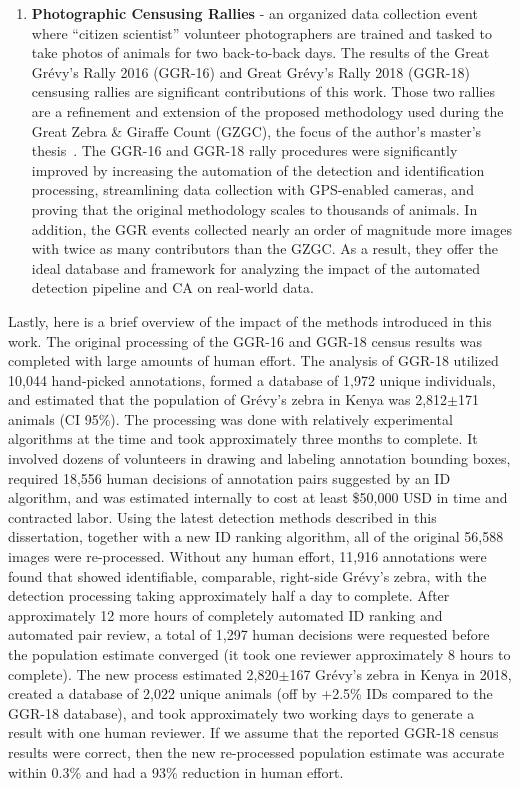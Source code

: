 \begin{enumerate}
    \item \textbf{Photographic Censusing Rallies} - an organized data collection event where ``citizen scientist'' volunteer photographers are trained and tasked to take photos of animals for two back-to-back days.  The results of the Great Gr\'evy's Rally 2016 (GGR-16) and Great Gr\'evy's Rally 2018 (GGR-18) censusing rallies are significant contributions of this work.  Those two rallies are a refinement and extension of the proposed methodology used during the Great Zebra \& Giraffe Count (GZGC), the focus of the author's master's thesis~\cite{parham_photographic_2015}.  The GGR-16 and GGR-18 rally procedures were significantly improved by increasing the automation of the detection and identification processing, streamlining data collection with GPS-enabled cameras, and proving that the original methodology scales to thousands of animals. In addition, the GGR events collected nearly an order of magnitude more images with twice as many contributors than the GZGC.  As a result, they offer the ideal database and framework for analyzing the impact of the automated detection pipeline and CA on real-world data.
\end{enumerate}

Lastly, here is a brief overview of the impact of the methods introduced in this work.  The original processing of the GGR-16 and GGR-18 census results was completed with large amounts of human effort.  The analysis of GGR-18 utilized 10,044 hand-picked annotations, formed a database of 1,972 unique individuals, and estimated that the population of Gr\'evy's zebra in Kenya was 2,812$\pm$171 animals (CI 95\%).  The processing was done with relatively experimental algorithms at the time and took approximately three months to complete.  It involved dozens of volunteers in drawing and labeling annotation bounding boxes, required 18,556 human decisions of annotation pairs suggested by an ID algorithm, and was estimated internally to cost at least \$50,000 USD in time and contracted labor.  Using the latest detection methods described in this dissertation, together with a new ID ranking algorithm, all of the original 56,588 images were re-processed.  Without any human effort, 11,916 annotations were found that showed identifiable, comparable, right-side Gr\'evy's zebra, with the detection processing taking approximately half a day to complete.  After approximately 12 more hours of completely automated ID ranking and automated pair review, a total of 1,297 human decisions were requested before the population estimate converged (it took one reviewer approximately 8 hours to complete). The new process estimated 2,820$\pm$167 Gr\'evy's zebra in Kenya in 2018, created a database of 2,022 unique animals (off by +2.5\% IDs compared to the GGR-18 database), and took approximately two working days to generate a result with one human reviewer.  If we assume that the reported GGR-18 census results were correct, then the new re-processed population estimate was accurate within 0.3\% and had a 93\% reduction in human effort.

